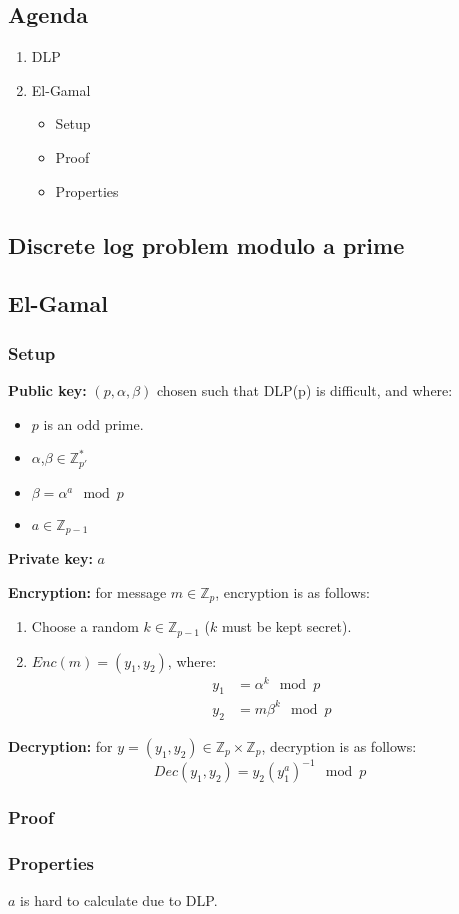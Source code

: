 

\subsection*{Agenda}
\begin{enumerate}
\item DLP
\item El-Gamal
  \begin{itemize}
  \item Setup
  \item Proof
  \item Properties
  \end{itemize}
\end{enumerate}


\subsection{Discrete log problem modulo a prime}


\subsection{El-Gamal}
\subsubsection*{Setup}
\textbf{Public key:} $(p,\alpha,\beta)$ chosen such that DLP(p) is
difficult, and where:
\begin{itemize}
\item $p$ is an odd prime.
\item $\alpha$,$\beta \in \mathbb{Z}_{p'}^*$
\item $\beta = \alpha^a \mod p$
\item $a \in \mathbb{Z}_{p-1} $
\end{itemize}

\textbf{Private key:} $a$

\textbf{Encryption:} for message $m \in \mathbb{Z}_p$, encryption is
as follows:
\begin{enumerate}
\item Choose a random $k \in \mathbb{Z}_{p-1}$ ($k$ must be kept secret).
\item $Enc(m) = (y_1,y_2)$, where:
  \begin{align*}
    y_1 &= \alpha^k \mod p\\
    y_2 &= m\beta^k \mod p
  \end{align*}
\end{enumerate}

\textbf{Decryption:} for $y = (y_1,y_2) \in \mathbb{Z}_p \times
\mathbb{Z}_p$, decryption is as follows:
\[ Dec(y_1,y_2) = y_2(y_1^a)^{-1} \mod p \]

\subsubsection*{Proof}


\subsubsection*{Properties}
$a$ is hard to calculate due to DLP.
